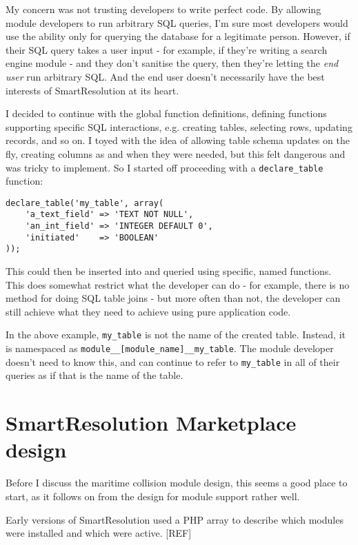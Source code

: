 My concern was not trusting developers to write perfect code. By allowing module developers to run arbitrary SQL queries, I'm sure most developers would use the ability only for querying the database for a legitimate person. However, if their SQL query takes a user input - for example, if they're writing a search engine module - and they don't sanitise the query, then they're letting the \emph{end user} run arbitrary SQL. And the end user doesn't necessarily have the best interests of SmartResolution at its heart.

I decided to continue with the global function definitions, defining functions supporting specific SQL interactions, e.g. creating tables, selecting rows, updating records, and so on. I toyed with the idea of allowing table schema updates on the fly, creating columns as and when they were needed, but this felt dangerous and was tricky to implement. So I started off proceeding with a \lstinline{declare_table} function:

\begin{lstlisting}
declare_table('my_table', array(
    'a_text_field' => 'TEXT NOT NULL',
    'an_int_field' => 'INTEGER DEFAULT 0',
    'initiated'    => 'BOOLEAN'
));
\end{lstlisting}

This could then be inserted into and queried using specific, named functions. This does somewhat restrict what the developer can do - for example, there is no method for doing SQL table joins - but more often than not, the developer can still achieve what they need to achieve using pure application code.

In the above example, \lstinline{my_table} is not the name of the created table. Instead, it is namespaced as \lstinline{module__[module_name]__my_table}. The module developer doesn't need to know this, and can continue to refer to \lstinline{my_table} in all of their queries as if that is the name of the table.

\section{SmartResolution Marketplace design}

Before I discuss the maritime collision module design, this seems a good place to start, as it follows on from the design for module support rather well.

Early versions of SmartResolution used a PHP array to describe which modules were installed and which were active. [REF] %

